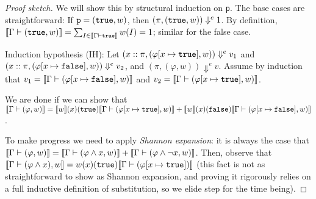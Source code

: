 \documentclass{tufte-handout}
\begin{document}
\begin{proof}[Proof sketch]
  We will show this by structural induction on \texttt{p}. 
  The base cases are straightforward: If $\texttt{p} = (\texttt{true}, w)$, then 
  $(\pi, (\texttt{true}, w)) \Downarrow^e 1$. By definition, $\llbracket {\Gamma \vdash (\texttt{true}, w)} \rrbracket = \sum_{I \in \llbracket {\Gamma \vdash \texttt{true}} \rrbracket} w(I) = 1$; 
  similar for the false case.

  Induction hypothesis (IH): Let $(x::\pi, (\varphi[x \mapsto \texttt{true}], w))
  \Downarrow^e v_1$ and $(x::\pi, (\varphi[x \mapsto \texttt{false}], w)) \Downarrow^e
  v_2$, and $(\pi, (\varphi, w)) \Downarrow^e v$. Assume by induction that $v_1
  = \llbracket {\Gamma \vdash (\varphi[x \mapsto \texttt{false}], w)} \rrbracket$ and $v_2 =
  \llbracket {\Gamma \vdash (\varphi [x \mapsto \texttt{true}], w)} \rrbracket$. 
  
  We are done if we can show that
$\llbracket {\Gamma \vdash (\varphi, w)} \rrbracket =
\llbracket {w} \rrbracket(x)(\texttt{true})\llbracket {\Gamma \vdash (\varphi[x \mapsto \texttt{true}], w)} \rrbracket +
\llbracket {w} \rrbracket(x)(\texttt{false})\llbracket {\Gamma \vdash (\varphi[x \mapsto \texttt{false}], w)} \rrbracket$.

To make progress we need to apply \emph{Shannon expansion}: it is always the case that 
$\llbracket {\Gamma \vdash (\varphi, w)} \rrbracket = \llbracket {\Gamma \vdash (\varphi \land x, w)} \rrbracket + 
\llbracket {\Gamma \vdash (\varphi \land \neg x, w)} \rrbracket$.
Then, observe that $\llbracket {\Gamma \vdash (\varphi \land x), w} \rrbracket = w(x)(\texttt{true})
\llbracket {\Gamma \vdash (\varphi[x \mapsto \texttt{true}])} \rrbracket$ (this fact is not as straightforward
to show as Shannon expansion, and proving it rigorously relies on a 
full inductive definition of substitution, so we elide step for the time being). 






\end{proof}
\end{document}
